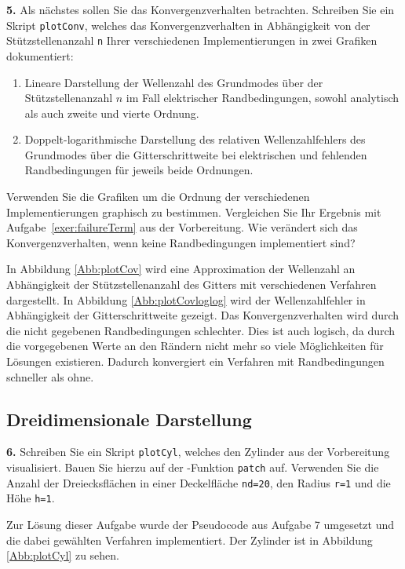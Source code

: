 \documentclass[Protokollheft.tex]{subfiles}
\begin{document}
	\begin{framed}
		\noindent \textbf{5.} Als nächstes sollen Sie das Konvergenzverhalten betrachten. Schreiben Sie ein Skript \lstinline{plotConv}, welches das Konvergenzverhalten in Abhängigkeit von der Stützstellenanzahl \lstinline{n}
		Ihrer verschiedenen Implementierungen in zwei Grafiken dokumentiert:
		\begin{enumerate}
			\item Lineare Darstellung der Wellenzahl des Grundmodes über der Stützstellenanzahl $n$ im Fall elektrischer Randbedingungen, sowohl analytisch als auch zweite und vierte Ordnung.
			\item Doppelt-logarithmische Darstellung des relativen Wellenzahlfehlers des Grundmodes  über die Gitterschrittweite bei elektrischen und fehlenden Randbedingungen für jeweils beide Ordnungen.
		\end{enumerate}
		Verwenden Sie die Grafiken um die Ordnung der verschiedenen Implementierungen graphisch zu bestimmen. Vergleichen Sie Ihr Ergebnis
		mit Aufgabe~\ref{exer:failureTerm} aus der Vorbereitung.  Wie verändert sich das Konvergenzverhalten, wenn keine Randbedingungen implementiert sind?\label{exer:plotConv}
	\end{framed}
	\noindent
	In Abbildung \ref{Abb:plotCov} wird eine Approximation der Wellenzahl an Abhängigkeit der Stützstellenanzahl des Gitters mit verschiedenen Verfahren dargestellt. In Abbildung \ref{Abb:plotCovloglog} wird der Wellenzahlfehler in Abhängigkeit der Gitterschrittweite gezeigt. Das Konvergenzverhalten wird durch die nicht gegebenen Randbedingungen schlechter. Dies ist auch logisch, da durch die vorgegebenen Werte an den Rändern nicht mehr so viele Möglichkeiten für Lösungen existieren. Dadurch konvergiert ein Verfahren mit Randbedingungen schneller als ohne. 
	
	

	{\subsection{Dreidimensionale Darstellung}}
	
	\begin{framed}
		\noindent \textbf{6.} Schreiben Sie ein Skript \lstinline{plotCyl}, welches den Zylinder aus der Vorbereitung visualisiert.
		Bauen Sie hierzu auf der \matlab-Funktion \lstinline{patch} auf. Verwenden Sie die Anzahl der Dreiecksflächen
		in einer Deckelfläche \lstinline{nd=20}, den Radius \lstinline{r=1} und die Höhe \lstinline {h=1}.\label{exer:plotCyl}
	\end{framed}
	\noindent
	Zur Lösung dieser Aufgabe wurde der Pseudocode aus Aufgabe 7 umgesetzt und die dabei gewählten Verfahren implementiert. Der Zylinder ist in Abbildung \ref{Abb:plotCyl} zu sehen.
	
\end{document}
